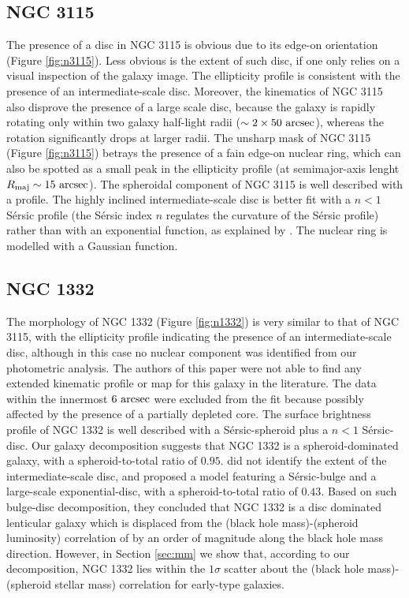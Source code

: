 \documentclass[useAMS,usenatbib,article]{mn2e}
\begin{document}
\subsection{NGC 3115}
The presence of a disc in NGC 3115 is obvious due to its edge-on orientation (Figure \ref{fig:n3115}). 
Less obvious is the extent of such disc, if one only relies on a visual inspection of the galaxy image. 
The ellipticity profile is consistent with the presence of an intermediate-scale disc. 
Moreover, the kinematics of NGC 3115 \citep{arnold2011n3115} also disprove the presence of a large scale disc, 
because the galaxy is rapidly rotating only within two galaxy half-light radii ($\sim 2 \times 50~\rm arcsec$), 
whereas the rotation significantly drops at larger radii.  
The unsharp mask of NGC 3115 (Figure \ref{fig:n3115}) betrays the presence of a fain edge-on nuclear ring, 
which can also be spotted as a small peak in the ellipticity profile 
(at semimajor-axis lenght $R_{\rm maj} \sim 15~\rm arcsec$).
The spheroidal component of NGC 3115 is well described with a \cite{sersic1963} profile.
The highly inclined intermediate-scale disc is better fit with a $n<1$ S\'ersic profile 
(the S\'ersic index $n$ regulates the curvature of the S\'ersic profile) 
rather than with an exponential function, 
as explained by \cite{pastrav2013a}. 
The nuclear ring is modelled with a Gaussian function. 


\subsection{NGC 1332}
The morphology of NGC 1332 (Figure \ref{fig:n1332}) is very similar to that of NGC 3115, 
with the ellipticity profile indicating the presence of an intermediate-scale disc, 
although in this case no nuclear component was identified from our photometric analysis. 
The authors of this paper were not able to find any extended kinematic profile or map 
for this galaxy in the literature. 
The data within the innermost $6~\rm arcsec$ were excluded from the fit 
because possibly affected by the presence of a partially depleted core.
The surface brightness profile of NGC 1332 is well described with a S\'ersic-spheroid plus
a $n<1$ S\'ersic-disc. 
Our galaxy decomposition suggests that NGC 1332 is a spheroid-dominated galaxy, 
with a spheroid-to-total ratio of $0.95$.
\cite{rusli2011} did not identify the extent of the intermediate-scale disc, 
and proposed a model featuring a S\'ersic-bulge and a large-scale exponential-disc, 
with a spheroid-to-total ratio of $0.43$.
Based on such bulge-disc decomposition, they concluded that NGC 1332 is a disc dominated lenticular galaxy 
which is displaced from the (black hole mass)-(spheroid luminosity) correlation of \cite{marconihunt2003} 
by an order of magnitude along the black hole mass direction. 
However, in Section \ref{sec:mm} we show that, according to our decomposition, 
NGC 1332 lies within the $1\sigma$ scatter about the (black hole mass)-(spheroid stellar mass) correlation 
for early-type galaxies. 
\end{document}
